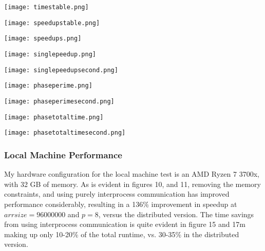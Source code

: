 \documentclass[11pt]{report}
\newcommand{\SCALE}{0.5}
\begin{document}
\begin{minipage}{\SCALE\linewidth}
\texttt{[image: timestable.png]}
\end{minipage}
\hfill
\begin{minipage}{\SCALE\linewidth}
\texttt{[image: speedupstable.png]}
\end{minipage}

\begin{minipage}{\SCALE\linewidth}
\texttt{[image: speedups.png]}
\end{minipage}
\hfill
\begin{minipage}{\SCALE\linewidth}
\texttt{[image: singlepeedup.png]}
\end{minipage}

\begin{minipage}{\SCALE\linewidth}
\texttt{[image: singlepeedupsecond.png]}
\end{minipage}

\begin{minipage}{\SCALE\linewidth}
\texttt{[image: phaseperime.png]}
\end{minipage}
\hfill
\begin{minipage}{\SCALE\linewidth}
\texttt{[image: phaseperimesecond.png]}
\end{minipage}

\begin{minipage}{\SCALE\linewidth}
\texttt{[image: phasetotaltime.png]}
\end{minipage}
\hfill
\begin{minipage}{\SCALE\linewidth}
\texttt{[image: phasetotaltimesecond.png]}
\end{minipage}


\subsubsection*{Local Machine Performance}
My hardware configuration for the local machine test is an AMD Ryzen 7 3700x, with 32 GB of memory. As is evident in figures 10, and 11, removing the memory constraints, and 
using purely interprocess communication has improved performance considerably, resulting in a
136\% improvement in speedup at $arrsize=96000000$ and $p=8$, versus the distributed version. The time savings from using interprocess communication is quite evident in figure 15 and 17m making up only 10-20\% of the total runtime, vs. 30-35\% in the distributed version.
\end{document}

